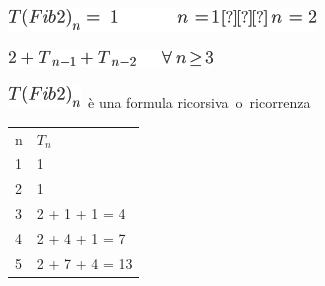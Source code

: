 \documentclass{article}
\begin{document}
\includegraphics{images/image29.png}

\includegraphics{images/image30.png}\includegraphics{images/image31.png}

{}

\includegraphics{images/image32.png}{~è una }{formula
ricorsiva}{~}{o}{~}{ricorrenza}

{}

\protect\hypertarget{t.b835927b516aa4a0b07c3acab4f4cd0150ff7dd8}{}{}\protect\hypertarget{t.1}{}{}

\begin{longtable}[]{@{}ll@{}}
\toprule
\begin{minipage}[t]{0.47\columnwidth}\raggedright\strut
{n}\strut
\end{minipage} & \begin{minipage}[t]{0.47\columnwidth}\raggedright\strut
$T_n$\strut
\end{minipage}\tabularnewline
\begin{minipage}[t]{0.47\columnwidth}\raggedright\strut
{1}\strut
\end{minipage} & \begin{minipage}[t]{0.47\columnwidth}\raggedright\strut
{1}\strut
\end{minipage}\tabularnewline
\begin{minipage}[t]{0.47\columnwidth}\raggedright\strut
{2}\strut
\end{minipage} & \begin{minipage}[t]{0.47\columnwidth}\raggedright\strut
{1}\strut
\end{minipage}\tabularnewline
\begin{minipage}[t]{0.47\columnwidth}\raggedright\strut
{3}\strut
\end{minipage} & \begin{minipage}[t]{0.47\columnwidth}\raggedright\strut
{2 + 1 + 1 = 4}\strut
\end{minipage}\tabularnewline
\begin{minipage}[t]{0.47\columnwidth}\raggedright\strut
{4}\strut
\end{minipage} & \begin{minipage}[t]{0.47\columnwidth}\raggedright\strut
{2 + 4 + 1 = 7}\strut
\end{minipage}\tabularnewline
\begin{minipage}[t]{0.47\columnwidth}\raggedright\strut
{5}\strut
\end{minipage} & \begin{minipage}[t]{0.47\columnwidth}\raggedright\strut
{2 + 7 + 4 = 13}\strut
\end{minipage}\tabularnewline
\bottomrule
\end{longtable}
\end{document}
